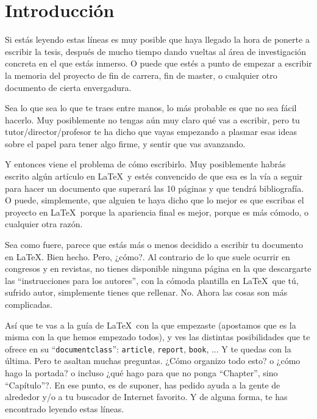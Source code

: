 \section{Introducción}
\label{cap1:sec:introduccion}


Si estás leyendo estas líneas es muy posible que haya llegado la hora
de ponerte a escribir la tesis, después de mucho tiempo dando vueltas
al área de investigación concreta en el que estás inmerso. O puede que
estés a punto de empezar a escribir la memoria del proyecto de fin de
carrera, fin de master, o cualquier otro documento de cierta
envergadura.

Sea lo que sea lo que te traes entre manos, lo más probable es que no
sea fácil hacerlo. Muy posiblemente no tengas aún muy claro qué vas a
escribir, pero tu tutor/director/profesor te ha dicho que vayas
empezando a plasmar esas ideas sobre el papel para tener algo firme, y
sentir que vas avanzando.

Y entonces viene el problema de cómo escribirlo. Muy posiblemente
habrás escrito algún artículo en \LaTeX\ y estés convencido de que esa
es la vía a seguir para hacer un documento que superará las 10 páginas
y que tendrá bibliografía. O puede, simplemente, que alguien te haya
dicho que lo mejor es que escribas el proyecto en \LaTeX\ porque la
apariencia final es mejor, porque es más cómodo, o cualquier otra
razón.

Sea como fuere, parece que estás más o menos decidido a escribir tu
documento en \LaTeX. Bien hecho. Pero, ¿cómo?. Al contrario de lo que
suele ocurrir en congresos y en revistas, no tienes disponible ninguna
página en la que descargarte las ``instrucciones para los autores'',
con la cómoda plantilla en \LaTeX\ que tú, sufrido autor, simplemente
tienes que rellenar. No. Ahora las cosas son más complicadas.

Así que te vas a la guía de \LaTeX\ con la que empezaste (apostamos
que es la misma con la que hemos empezado todos), y ves las distintas
posibilidades que te ofrece en su ``\texttt{documentclass}'':
\texttt{article}, \texttt{report}, \texttt{book}, ... Y te quedas con
la última. Pero te asaltan muchas preguntas. ¿Cómo organizo todo esto?
o ¿cómo hago la portada? o incluso ¿qué hago para que no ponga
``Chapter'', sino ``Capítulo''?. En ese punto, es de suponer, has
pedido ayuda a la gente de alrededor y/o a tu buscador de Internet
favorito. Y de alguna forma, te has encontrado leyendo estas líneas.

